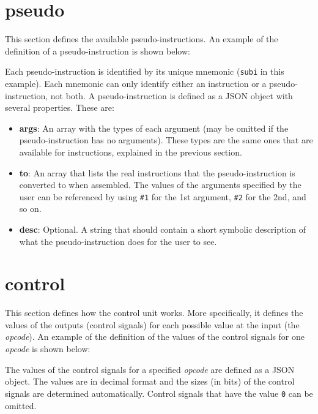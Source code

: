 \documentclass[11pt,a4paper,twoside,titlepage]{report}
\begin{document}
\section{pseudo}

This section defines the available pseudo-instructions.
An example of the definition of a pseudo-instruction is shown below:



Each pseudo-instruction is identified by its unique mnemonic (\verb+subi+ 
in this example). Each mnemonic can only identify either an instruction or a
pseudo-instruction, not both.
A pseudo-instruction is defined as a JSON object with several properties. 
These are:

\begin{itemize}
	\item \textbf{args}: An array with the types of each argument (may be omitted if
		the pseudo-instruction has no arguments). These types are the same ones that are
		available for instructions, explained in the previous section.
	\item \textbf{to}: An array that lists the real instructions that the
		pseudo-instruction is converted to when assembled. The values of the arguments
		specified by the user can be referenced by using \verb+#1+ for the 1st argument,
		\verb+#2+ for the 2nd, and so on.
	\item \textbf{desc}: Optional. A string that should contain a short symbolic
		description of what the pseudo-instruction does for the user to see.
\end{itemize}


\section{control}

This section defines how the control unit works. More specifically, it
defines the values of the outputs (control signals) for each possible value at
the input (the \emph{opcode}).
An example of the definition of the values of the control signals for one
\emph{opcode} is shown below:



The values of the control signals for a specified \emph{opcode} are defined as
a JSON object. The values are in decimal format and the sizes (in bits) of the 
control signals are determined automatically.
Control signals that have the value \verb+0+ can be omitted.
\end{document}
